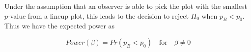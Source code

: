 \documentclass{article}
\newcommand{\red}[1]{{\color{red} #1}} %
\begin{document}

Under the assumption that an observer is able to pick the plot with the smallest $p$-value from a lineup plot,  this leads to the decision to reject $H_0$ when $p_{B} < p_0$. Thus we have the expected power as 

\begin{equation}\label{power_exp} 
   Power(\beta)=Pr(p_{B} < p_0)  \quad \text{for}  \quad \beta \ne 0
\end{equation}
\end{document}
